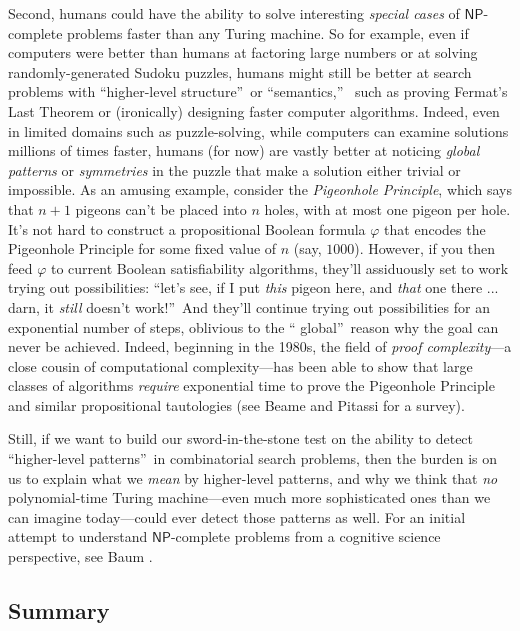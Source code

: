 \documentclass[12pt,onecolumn]{article}%
\begin{document}
Second, humans could have the ability to solve interesting \textit{special
cases} of $\mathsf{NP}$-complete problems faster than any Turing machine.
 So for example, even if computers were better than humans at factoring large
numbers or at solving randomly-generated Sudoku puzzles, humans might still be
better at search problems with \textquotedblleft higher-level
structure\textquotedblright\  or \textquotedblleft semantics,\textquotedblright\ %
 such as proving Fermat's Last Theorem or (ironically) designing faster
computer algorithms. Indeed, even in limited domains such as puzzle-solving,
while computers can examine solutions millions of times faster, humans (for
now) are vastly better at noticing \textit{global patterns} or
\textit{symmetries} in the puzzle that make a solution either trivial or
impossible. As an amusing example, consider the \textit{Pigeonhole
Principle}, which says that $n+1$ pigeons can't be placed into $n$ holes,
with at most one pigeon per hole. It's not hard to construct a propositional
Boolean formula $\varphi$ that encodes the Pigeonhole Principle for some
fixed value of $n$ (say, $1000$). However, if you then feed $\varphi$ to
current Boolean satisfiability algorithms, they'll assiduously set to work
trying out possibilities: \textquotedblleft let's see, if I put \textit{this}
pigeon here, and \textit{that} one there ... darn, it \textit{still} doesn't
work!\textquotedblright\  And they'll continue trying out possibilities for
an exponential number of steps, oblivious to the \textquotedblleft
global\textquotedblright\  reason why the goal can never be achieved. Indeed,
beginning in the 1980s, the field of \textit{proof complexity}---a close
cousin of computational complexity---has been able to show that large classes
of algorithms \textit{require} exponential time to prove the Pigeonhole
Principle and similar propositional tautologies (see Beame and Pitassi
\cite{beamepitassi} for a survey).

Still, if we want to build our sword-in-the-stone test on the ability to
detect \textquotedblleft higher-level patterns\textquotedblright\  in
combinatorial search problems, then the burden is on us to explain what we
\textit{mean} by higher-level patterns, and why we think that \textit{no}
polynomial-time Turing machine---even much more sophisticated ones than we can
imagine today---could ever detect those patterns as well. For an initial
attempt to understand $\mathsf{NP}$-complete problems from a cognitive
science perspective, see Baum \cite{baum}.

\subsection{Summary}
\end{document}
